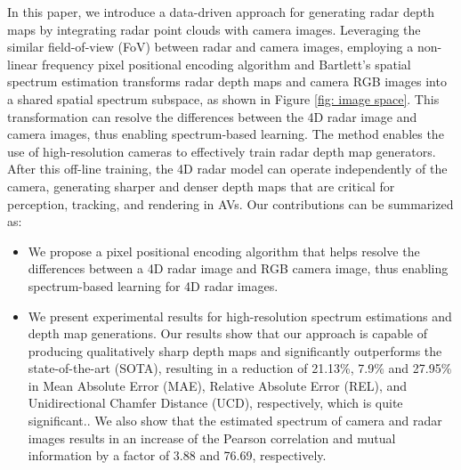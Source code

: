 \par In this paper, we introduce a data-driven approach for generating radar depth maps by integrating radar point clouds with camera images. Leveraging the similar field-of-view (FoV) between radar and camera images, employing a non-linear frequency pixel positional encoding algorithm and Bartlett's spatial spectrum estimation \cite{Bartlett1948} transforms radar depth maps and camera RGB images into a shared spatial spectrum subspace, as shown in Figure \ref{fig: image space}. This transformation can resolve the differences between the 4D radar image and camera images, thus enabling spectrum-based learning. The method enables the use of high-resolution cameras to effectively train radar depth map generators. After this off-line training, the 4D radar model can operate independently of the camera, generating sharper and denser depth maps that are critical for perception, tracking, and rendering in AVs. Our contributions can be summarized as:

\begin{itemize}
\item We propose a pixel positional encoding algorithm that helps resolve the differences between a 4D radar image and RGB camera image, thus enabling spectrum-based learning for 4D radar images.


\item We present experimental results for high-resolution spectrum estimations and depth map generations. Our results show that our approach is capable of producing qualitatively sharp depth maps and significantly outperforms the state-of-the-art (SOTA), resulting in a reduction of 21.13\%, 7.9\% and 27.95\% in Mean Absolute Error (MAE), Relative Absolute Error (REL), and Unidirectional Chamfer Distance (UCD), respectively, which is quite significant.\cite{zhang2021unsupervised}. We also show that the estimated spectrum of camera and radar images results in an increase of the Pearson correlation and mutual information by a factor of 3.88 and 76.69, respectively.

\end{itemize}